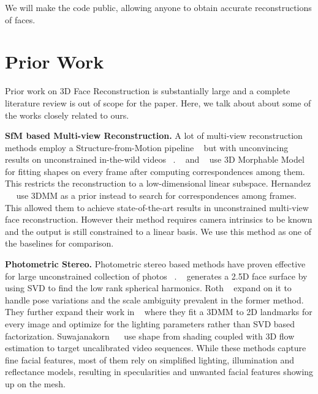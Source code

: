 \documentclass[10pt,twocolumn,letterpaper]{article}
\begin{document}
We will make the code public, allowing anyone to obtain accurate reconstructions of faces.

\section{Prior Work}
Prior work on 3D Face Reconstruction is substantially large and a complete literature review is out of scope for the paper. Here, we talk about about some of the works closely related to ours.

\noindent \textbf{SfM based Multi-view Reconstruction.} A lot of multi-view reconstruction methods employ a Structure-from-Motion pipeline ~\cite{gotardo2015photogeometric, lin2010accurate, fidaleo2007model} but with unconvincing results on unconstrained in-the-wild videos ~\cite{hernandez2017accurate}. ~\cite{brand2001morphable} and ~\cite{shi2014automatic} use 3D Morphable Model~\cite{blanz1999morphable} for fitting shapes on every frame after computing correspondences among them. This restricts the reconstruction to a low-dimensional linear subspace. Hernandez ~\etal ~\cite{hernandez2017accurate} use 3DMM as a prior instead to search for correspondences among frames. This allowed them to achieve state-of-the-art results in unconstrained multi-view face reconstruction. However their method requires camera intrinsics to be known and the output is still constrained to a linear basis. We use this method as one of the baselines for comparison.

\noindent \textbf{Photometric Stereo.} Photometric stereo based methods have proven effective for large unconstrained collection of photos ~\cite{kemelmacher2011face, kemelmacher2013internet, roth2015unconstrained}. ~\cite{kemelmacher2011face} generates a 2.5D face surface by using SVD to find the low rank spherical harmonics. Roth \etal ~\cite{roth2015unconstrained} expand on it to handle pose variations and the scale ambiguity prevalent in the former method. They further expand their work in ~\cite{roth2016adaptive} where they fit a 3DMM to 2D landmarks for every image and optimize for the lighting parameters rather than SVD based factorization. Suwajanakorn ~\etal ~\cite{suwajanakorn2014total} use shape from shading coupled with 3D flow estimation to target uncalibrated video sequences. While these methods capture fine facial features, most of them rely on simplified lighting, illumination and reflectance models, resulting in specularities and unwanted facial features showing up on the mesh.
\end{document}
